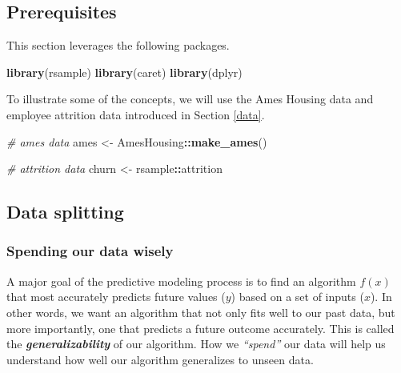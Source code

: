 \documentclass[]{book}
\newenvironment{Shaded}{\begin{snugshade}}{\end{snugshade}}
\newcommand{\CommentTok}[1]{\textcolor[rgb]{0.56,0.35,0.01}{\textit{#1}}}
\newcommand{\KeywordTok}[1]{\textcolor[rgb]{0.13,0.29,0.53}{\textbf{#1}}}
\newcommand{\NormalTok}[1]{#1}
\newcommand{\OperatorTok}[1]{\textcolor[rgb]{0.81,0.36,0.00}{\textbf{#1}}}
\newcommand{\StringTok}[1]{\textcolor[rgb]{0.31,0.60,0.02}{#1}}
\theoremstyle{definition}
\theoremstyle{definition}
\theoremstyle{definition}
\theoremstyle{remark}
\begin{document}
\hypertarget{reg_perf_prereq}{%
\subsection{Prerequisites}\label{reg_perf_prereq}}

This section leverages the following packages.

\begin{Shaded}
\begin{Highlighting}[]
\KeywordTok{library}\NormalTok{(rsample)}
\KeywordTok{library}\NormalTok{(caret)}
\KeywordTok{library}\NormalTok{(dplyr)}
\end{Highlighting}
\end{Shaded}

To illustrate some of the concepts, we will use the Ames Housing data
and employee attrition data introduced in Section \ref{data}.

\begin{Shaded}
\begin{Highlighting}[]
\CommentTok{# ames data}
\NormalTok{ames <-}\StringTok{ }\NormalTok{AmesHousing}\OperatorTok{::}\KeywordTok{make_ames}\NormalTok{()}

\CommentTok{# attrition data}
\NormalTok{churn <-}\StringTok{ }\NormalTok{rsample}\OperatorTok{::}\NormalTok{attrition}
\end{Highlighting}
\end{Shaded}

\hypertarget{reg-perf-split}{%
\subsection{Data splitting}\label{reg-perf-split}}

\hypertarget{spending-our-data-wisely}{%
\subsubsection{Spending our data
wisely}\label{spending-our-data-wisely}}

A major goal of the predictive modeling process is to find an algorithm
\(f(x)\) that most accurately predicts future values (\(y\)) based on a
set of inputs (\(x\)). In other words, we want an algorithm that not
only fits well to our past data, but more importantly, one that predicts
a future outcome accurately. This is called the
\textbf{\emph{generalizability}} of our algorithm. How we
\emph{``spend''} our data will help us understand how well our algorithm
generalizes to unseen data.
\end{document}
